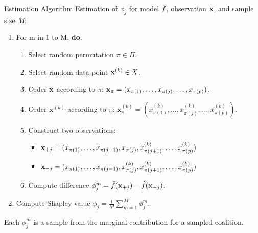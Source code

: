 \documentclass[11pt,compress,t,notes=noshow, aspectratio=169, xcolor=table]{beamer}
\begin{document}
\newcommand{\xk}{\mathbf{x}^{(k)}}

\begin{frame}{Estimation Algorithm }
Estimation of $\phi_j$ for model $\fh$, observation $\xv$, and sample size $M$:
\vspace{0.25cm}
  \begin{enumerate}
      \item For m in 1 to M, \textbf{do}:
      \begin{enumerate}
        \item Select random permutation $\pi \in \Pi$.
        \item Select random data point $\xv^{(k)} \in X$.
        \item Order $\xv$ according to $\pi$: $\xv_{\pi} = (x_{\pi(1)}, \ldots, x_{\pi(j)}, \ldots, x_{\pi(p)})$.
        \item Order $\xk$ according to $\pi$: $\xk_{\pi} = (x^{(k)}_{\pi(1)}, \ldots, x^{(k)}_{\pi(j)}, \ldots, x^{(k)}_{\pi(p)})$.
        \item Construct two observations:
          \begin{itemize}
          \setlength\itemsep{.5em}
            \item $\xv_{+j} = (x_{\pi(1)}, \ldots, x_{\pi(j - 1)}, x_{\pi(j)}, x^{(k)}_{\pi(j + 1)}, \ldots, x^{(k)}_{\pi(p)}) $
            \item $\xv_{-j} = (x_{\pi(1)}, \ldots, x_{\pi(j - 1)}, x^{(k)}_{\pi(j)}, x^{(k)}_{\pi(j + 1)}, \ldots, x^{(k)}_{\pi(p)}) $
          \end{itemize}
        \item Compute difference $\phi_j^m = \fh(\xv_{+j}) - \fh(\xv_{-j})$.
      \end{enumerate}
    \item Compute Shapley value $\phi_j = \frac{1}{M}\sum_{m=1}^M \phi_j^m$.
  \end{enumerate}

  Each $\phi_j^m$ is a sample from the marginal contribution for a sampled coalition.


\end{frame}
\end{document}
